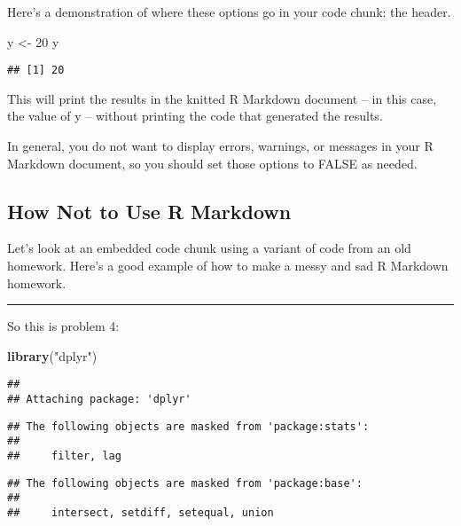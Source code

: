 \documentclass[]{article}
\newenvironment{Shaded}{\begin{snugshade}}{\end{snugshade}}
\newcommand{\DecValTok}[1]{\textcolor[rgb]{0.00,0.00,0.81}{#1}}
\newcommand{\KeywordTok}[1]{\textcolor[rgb]{0.13,0.29,0.53}{\textbf{#1}}}
\newcommand{\NormalTok}[1]{#1}
\newcommand{\StringTok}[1]{\textcolor[rgb]{0.31,0.60,0.02}{#1}}
\begin{document}
Here's a demonstration of where these options go in your code chunk: the
header.

\begin{Shaded}
\begin{Highlighting}[]
\NormalTok{y <-}\StringTok{ }\DecValTok{20}
\NormalTok{y}
\end{Highlighting}
\end{Shaded}

\begin{verbatim}
## [1] 20
\end{verbatim}

This will print the results in the knitted R Markdown document -- in
this case, the value of y -- without printing the code that generated
the results.

In general, you do not want to display errors, warnings, or messages in
your R Markdown document, so you should set those options to FALSE as
needed.

\hypertarget{how-not-to-use-r-markdown}{%
\subsection{How Not to Use R Markdown}\label{how-not-to-use-r-markdown}}

Let's look at an embedded code chunk using a variant of code from an old
homework. Here's a good example of how to make a messy and sad R
Markdown homework.

\begin{center}\rule{0.5\linewidth}{\linethickness}\end{center}

So this is problem 4:

\begin{Shaded}
\begin{Highlighting}[]
\KeywordTok{library}\NormalTok{(}\StringTok{"dplyr"}\NormalTok{)}
\end{Highlighting}
\end{Shaded}

\begin{verbatim}
## 
## Attaching package: 'dplyr'
\end{verbatim}

\begin{verbatim}
## The following objects are masked from 'package:stats':
## 
##     filter, lag
\end{verbatim}

\begin{verbatim}
## The following objects are masked from 'package:base':
## 
##     intersect, setdiff, setequal, union
\end{verbatim}
\end{document}
